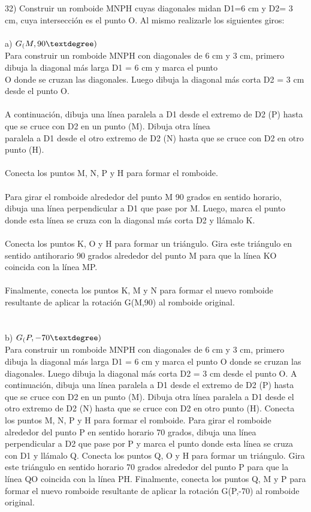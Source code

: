 \documentclass{article}
\begin{document}
32) Construir un romboide MNPH cuyas diagonales midan D1=6 cm y D2= 3 cm, cuya intersección es el punto O. Al mismo
realizarle los siguientes giros: \\ \\ 
a) $G_(M,90\textdegree)$ \\
Para construir un romboide MNPH con diagonales de 6 cm y 3 cm, primero dibuja la diagonal más larga D1 = 6 cm y marca el punto\\
O donde se cruzan las diagonales. Luego dibuja la diagonal más corta D2 = 3 cm desde el punto O.\\
\\
A continuación, dibuja una línea paralela a D1 desde el extremo de D2 (P) hasta que se cruce con D2 en un punto (M). Dibuja otra línea\\
paralela a D1 desde el otro extremo de D2 (N) hasta que se cruce con D2 en otro punto (H).\\
\\
Conecta los puntos M, N, P y H para formar el romboide.\\
\\
Para girar el romboide alrededor del punto M 90 grados en sentido horario, dibuja una línea perpendicular a D1 que pase por M. Luego, marca el punto donde esta línea se cruza con la diagonal más corta D2 y llámalo K.\\
\\
Conecta los puntos K, O y H para formar un triángulo. Gira este triángulo en sentido antihorario 90 grados alrededor del punto M para que la línea KO coincida con la línea MP.\\
\\
Finalmente, conecta los puntos K, M y N para formar el nuevo romboide resultante de aplicar la rotación G(M,90) al romboide original.\\
\\
\\
b) $G_(P,-70\textdegree)$ \\
 Para construir un romboide MNPH con diagonales de 6 cm y 3 cm, primero dibuja la diagonal más larga D1 = 6 cm y marca el punto
O donde se cruzan las diagonales. Luego dibuja la diagonal más corta D2 = 3 cm desde el punto O.   A continuación, dibuja una línea paralela a D1 desde el extremo de D2 (P) hasta que se cruce con D2 en un punto (M). Dibuja otra línea paralela a D1 desde el otro extremo de D2 (N) hasta que se cruce con D2 en otro punto (H).   Conecta los puntos M, N, P y H para formar el romboide.   Para girar el romboide alrededor del punto P en sentido horario 70 grados, dibuja una línea perpendicular a D2 que pase por P y marca el punto donde esta línea se cruza con D1 y llámalo Q.   Conecta los puntos Q, O y H para formar un triángulo. Gira este triángulo en sentido horario 70 grados alrededor del punto P para que la línea QO coincida con la línea PH.   Finalmente, conecta los puntos Q, M y P para formar el nuevo romboide resultante de aplicar la rotación G(P,-70) al romboide original.
\end{document}
